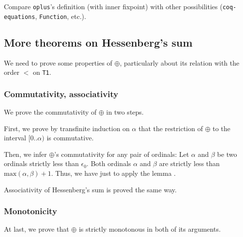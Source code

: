     \begin{project}
    Compare \texttt{oplus}'s definition (with inner fixpoint) with other possibilities
    (\texttt{coq-equations}, \texttt{Function}, etc.).
    \end{project}
    \subsection{More theorems on Hessenberg's sum}

    We need to prove some properties of $\oplus$, particularly about 
    its relation with the order $<$ on \texttt{T1}.

    \subsubsection{Commutativity, associativity}

    We prove  the commutativity of $\oplus$ in two steps. 

    First, we prove by transfinite induction on $\alpha$ that the restriction of $\oplus$ to the
    interval $[0..\alpha)$ is commutative.


    

    

    Then, we infer  $\oplus$'s commutativity for any pair of ordinals:
    Let $\alpha$ and $\beta$ be two ordinals strictly less than $\epsilon_0$. Both ordinals $\alpha$ and $\beta$ are
    strictly less than $\textrm{max}(\alpha,\beta)+1$.
        Thus, we have just to apply the lemma .


  

    Associativity of Hessenberg's sum is proved the same way.

    
    
    
    
 

    \subsubsection{Monotonicity}

    At last, we prove that $\oplus$ is strictly monotonous in both of its arguments.

    
    
